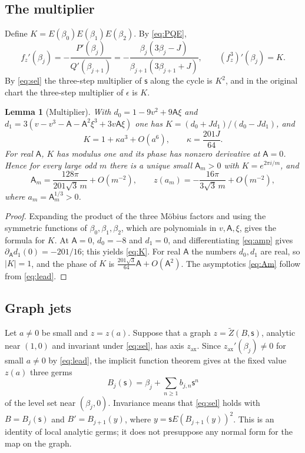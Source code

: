\documentclass[11pt]{amsart}
\numberwithin{equation}{section}
\newtheorem{lemma}[theorem]{Lemma}
\theoremstyle{definition}
\theoremstyle{remark}
\newcommand{\abs}[1]{\lvert #1\rvert}
\newcommand{\sA}{\mathsf A}
\newcommand{\ssf}{\mathsf s}
\begin{document}
\subsection{The multiplier}
Define $K=E(\beta_0)E(\beta_1)E(\beta_2)$. By \eqref{eq:PQE},
\begin{equation}\label{eq:mult}
f_z'(\beta_j)=-\frac{P'(\beta_j)}{Q'(\beta_{j+1})}=-\frac{\beta_j(3\beta_j-J)}{\beta_{j+1}(3\beta_{j+1}+J)},\qquad (f_z^3)'(\beta_j)=K .
\end{equation}
By \eqref{eq:sel} the three-step multiplier of $\ssf$ along the cycle is $K^2$, and in the original chart the three-step multiplier of $\epsilon$ is $K$.

\begin{lemma}[Multiplier]\label{lem:mult}
With $d_0=1-9v^2+9\sA\xi$ and $d_1=3(v-v^3-\sA-\sA^2\xi^3+3v\sA\xi)$ one has $K=(d_0+Jd_1)/(d_0-Jd_1)$, and
\begin{equation}\label{eq:K}
K=1+\kappa a^3+O(a^6),\qquad \kappa=\frac{201J}{64}.
\end{equation}
For real $\sA$, $K$ has modulus one and its phase has nonzero derivative at $\sA=0$. Hence for every large odd $m$ there is a unique small $\sA_m>0$ with $K=e^{2\pi i/m}$, and
\begin{equation}\label{eq:Am}
\sA_m=\frac{128\pi}{201\sqrt3\,m}+O(m^{-2}),\qquad z(a_m)=-\frac{16\pi}{3\sqrt3\,m}+O(m^{-2}),
\end{equation}
where $a_m=\sA_m^{1/3}>0$.
\end{lemma}

\begin{proof}
Expanding the product of the three M\"obius factors and using the symmetric functions of $\beta_0,\beta_1,\beta_2$, which are polynomials in $v,\sA,\xi$, gives the formula for $K$. At $\sA=0$, $d_0=-8$ and $d_1=0$, and differentiating \eqref{eq:amp} gives $\partial_\sA d_1(0)=-201/16$; this yields \eqref{eq:K}. For real $\sA$ the numbers $d_0,d_1$ are real, so $\abs K=1$, and the phase of $K$ is $\frac{201\sqrt3}{64}\sA+O(\sA^2)$. The asymptotics \eqref{eq:Am} follow from \eqref{eq:lead}.
\end{proof}

\subsection{Graph jets}
Let $a\ne0$ be small and $z=z(a)$. Suppose that a graph $z=\widetilde Z(B,\ssf)$, analytic near $(1,0)$ and invariant under \eqref{eq:sel}, has axis $z_{\mathrm{ax}}$. Since $z_{\mathrm{ax}}'(\beta_j)\ne0$ for small $a\ne0$ by \eqref{eq:lead}, the implicit function theorem gives at the fixed value $z(a)$ three germs
\[
B_j(\ssf)=\beta_j+\sum_{n\ge1}b_{j,n}\ssf^n
\]
of the level set near $(\beta_j,0)$. Invariance means that \eqref{eq:sel} holds with $B=B_j(\ssf)$ and $B'=B_{j+1}(y)$, where $y=\ssf E(B_{j+1}(y))^2$. This is an identity of local analytic germs; it does not presuppose any normal form for the map on the graph.
\end{document}
